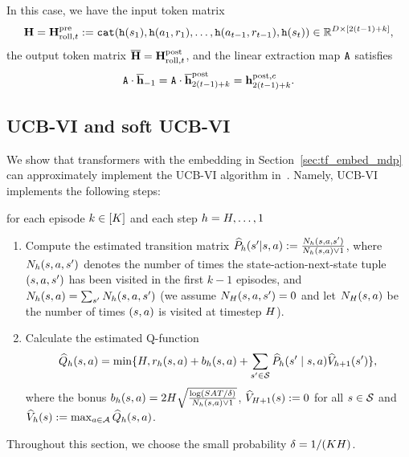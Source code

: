In this case, we have the input token matrix  $${\mathbf H}={\mathbf H}^{\mathrm{pre}}_{{\mathrm{roll}},t}: = {\tt cat}({\tt h}({s}_1), {\tt h}({a}_1, {r}_1), \ldots, {\tt h}({a}_{t-1}, {r}_{t-1}), {\tt h}({s}_t)) \in \mathbb{R}^{D \times [2(t-1)+k]},$$ the output token matrix $\overline{{\mathbf H}}={\mathbf H}^{\mathrm{post}}_{{\mathrm{roll}},t}$, and the linear extraction map ${\tt A}$  satisfies $${\tt A}\cdot\overline{{\mathbf h}}_{-1}={\tt A}\cdot\overline{{\mathbf h}}^{\mathrm{post}}_{2(t-1)+k}={\mathbf h}^{{\mathrm{post}},{c}}_{2(t-1)+k}.$$






























\subsection{UCB-VI and soft UCB-VI}\label{sec:example_ucbvi}
We show that transformers with the embedding in Section~\ref{sec:tf_embed_mdp}  can approximately implement the  UCB-VI algorithm in~\cite{azar2017minimax}. Namely, UCB-VI implements the following steps:

for each episode $k\in[{K}]$ and each step $h={H},\ldots,1$
\begin{enumerate}
    \item Compute the estimated transition matrix $\widehat{P}_h({s}'|{s},{a}):=   \frac{{N}_h({s},{a},{s}')}{{N}_h({s},{a})\vee 1}$,  where ${N}_h({s},{a},{s}')$ denotes the number of times the state-action-next-state tuple $({s},{a},{s}')$ has been visited in the first $k-1$ episodes, and ${N}_h({s},{a})=\sum_{{s}'}{N}_h({s},{a},{s}')$ (we assume ${N}_{H}({s},{a},{s}')=0$ and let ${N}_{H}({s},{a})$  be the number of times $({s},{a})$ is visited at timestep ${H}$).
    \item Calculate the estimated Q-function \begin{align*}
{\widehat{{Q}}}_h({s},{a})=\min\{{H},{r}_h({s},{a})+{b}_h({s},{a})+\sum_{{s}'\in{\mathcal{S}}}\widehat{P}_h({s}'\mid{s},{a}){\widehat{{{V}}}}_{h+1}({s}')\},\end{align*}
where the bonus ${b}_h({s},{a})=2{H}\sqrt{\frac{\log({S}{A}{T}/\delta)}{{N}_h({s},{a})\vee1}}$,  ${\widehat{{{V}}}}_{{H}+1}({s}):=0$ for all ${s}\in{\mathcal{S}}$ and ${\widehat{{{V}}}}_h({s}):=\max_{{a}\in{\mathcal{A}}}{\widehat{{Q}}}_h({s},{a})$.
\end{enumerate} Throughout this section, we choose the small probability $\delta=1/({K}{H})$.


